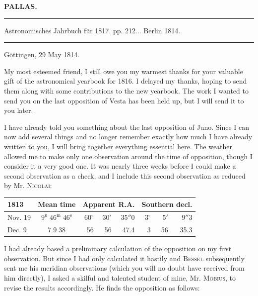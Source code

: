 \clearpage{}
\begin{center}\textbf{PALLAS.}\par\vspace{4pt}\hrule\vspace{4pt}\fontsize{10}{12}\selectfont Astronomisches Jahrbuch für 1817. pp. 212\;... Berlin 1814.\par\vspace{4pt}\hrule\vspace{4pt}\end{center}

\begin{flushright}
Göttingen, 29 May 1814.
\end{flushright}

\par\indent My most esteemed friend, I still owe you my warmest thanks for your valuable gift of the astronomical yearbook for 1816. I delayed my thanks, hoping to send them along with some contributions to the new yearbook. The work I wanted to send you on the last opposition of Vesta has been held up, but I will send it to you later.

\par\indent I have already told you something about the last opposition of Juno. Since I can now add several things and no longer remember exactly how much I have already written to you, I will bring together everything essential here. The weather allowed me to make only one observation around the time of opposition, though I consider it a very good one. It was nearly three weeks before I could make a second observation as a check, and I include this second observation as reduced by Mr. \textsc{Nicolai}:

\begin{center}\fontsize{10}{12}\selectfont\setlength{\tabcolsep}{3pt}\renewcommand{\arraystretch}{1.15}\begin{tabular}{l|c|rrr|rrr}
1813 & Mean time & \multicolumn{3}{c|}{Apparent R.A.} & \multicolumn{3}{c}{Southern decl.}\\\hline
Nov. 19 & $9^{\mathrm u}\;46^{\mathrm m}\;46^{\mathrm s}$ & $60^\circ$ & $30'$ & $35''0$ & $3^\circ$ & $5'$ & $9''3$\\
Dec. 9 & $7\;9\;38$ & 56 & 56 & 47.4 & 3 & 56 & 35.3\\
\end{tabular}\end{center}

\par\indent I had already based a preliminary calculation of the opposition on my first observation. But since I had only calculated it hastily and \textsc{Bessel} subsequently sent me his meridian observations (which you will no doubt have received from him directly), I asked a skilful and talented student of mine, Mr. \textsc{Möbius}, to revise the results accordingly. He finds the opposition as follows:

